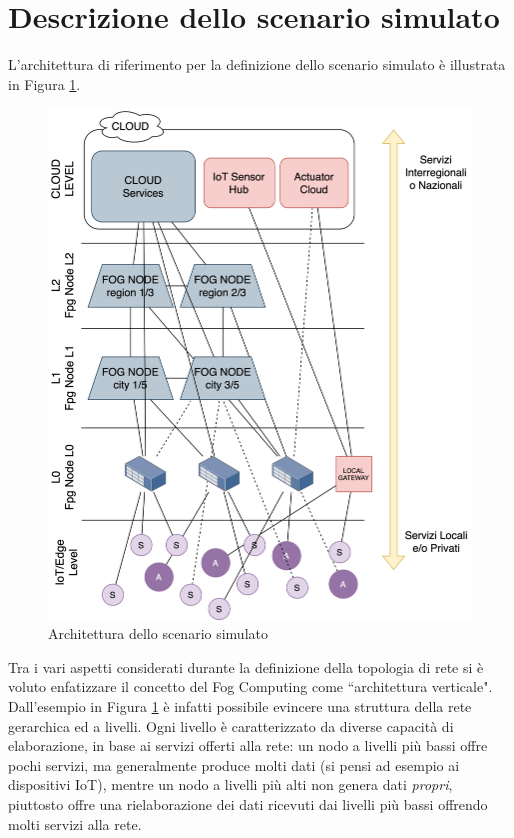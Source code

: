 \section{Descrizione dello scenario simulato}

L'architettura di riferimento per la definizione dello scenario simulato è illustrata in Figura \ref{fig:architettura_scenario}.

\begin{figure}[!ht]
  \includegraphics[width=14cm]{images/architettura_scenario}
  \centering
  \caption{Architettura dello scenario simulato}
  \label{fig:architettura_scenario}
\end{figure}

Tra i vari aspetti considerati durante la definizione della topologia di rete si è voluto enfatizzare il concetto del Fog Computing come ``architettura verticale". Dall'esempio in Figura \ref{fig:architettura_scenario} è infatti possibile evincere una struttura della rete gerarchica ed a livelli. Ogni livello è caratterizzato da diverse capacità di elaborazione, in base ai servizi offerti alla rete: un nodo a livelli più bassi offre pochi servizi, ma generalmente produce molti dati (si pensi ad esempio ai dispositivi IoT), mentre un nodo a livelli più alti non genera dati \textit{propri}, piuttosto offre una rielaborazione dei dati ricevuti dai livelli più bassi offrendo molti servizi alla rete.

